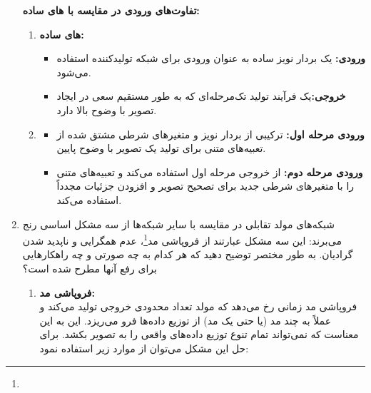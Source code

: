 \begin{enumerate}
\begin{qsolve}
		
		
		
		\textbf{تفاوت‌های ورودی در مقایسه با  های ساده: }\\
		\begin{enumerate}
			\item \textbf{ های ساده:}
			\begin{itemize}
				\item \textbf{ورودی:} یک بردار نویز ساده به عنوان ورودی برای شبکه تولیدکننده استفاده می‌شود.
				\item \textbf{خروجی:}یک فرآیند تولید تک‌مرحله‌ای که به طور مستقیم سعی در ایجاد تصویر با وضوح بالا دارد.
			\end{itemize}
			
			
			\item \textbf{}
			\begin{itemize}
				\item \textbf{ورودی مرحله اول: }ترکیبی از بردار نویز و متغیرهای شرطی مشتق شده از تعبیه‌های متنی برای تولید یک تصویر با وضوح پایین.
				
				\item \textbf{ورودی مرحله دوم: }از خروجی مرحله اول استفاده می‌کند و تعبیه‌های متنی را با متغیرهای شرطی جدید برای تصحیح تصویر و افزودن جزئیات مجدداً استفاده می‌کند.
			\end{itemize}
		\end{enumerate}
	\end{qsolve}
	
	
	
	
	
	
	
	
	
	
	
	\item 
شبکه‌های مولد تقابلی در مقایسه با سایر شبکه‌ها از سه مشکل اساسی رنج می‌برند: این سه مشکل عبارتند از فروپاشی مد\footnote{}، عدم همگرایی و ناپدید شدن گرادیان. به طور مختصر توضیح دهید که هر کدام به چه صورتی و چه راهکارهایی برای رفع آنها مطرح شده است؟

	\begin{qsolve}
		\begin{enumerate}
			\item \textbf{فروپاشی مد:}\\
فروپاشی مد زمانی رخ می‌دهد که مولد تعداد محدودی خروجی تولید می‌کند و عملاً به چند مد (یا حتی یک مد) از توزیع داده‌ها فرو می‌ریزد. این به این معناست که  نمی‌تواند تمام تنوع توزیع داده‌های واقعی را به تصویر بکشد. برای حل این مشکل می‌توان از موارد زیر استفاده نمود:


\end{enumerate}
\end{qsolve}
\end{enumerate}
